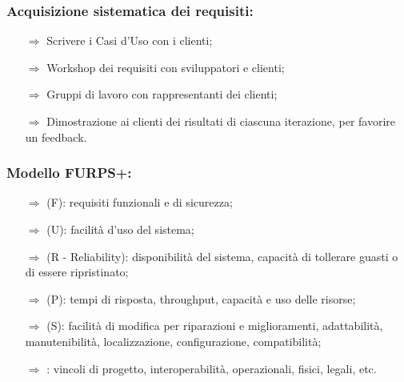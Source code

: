 
\subsubsection{Acquisizione sistematica dei requisiti:}

\begin{itemize}
    \item [$\Rightarrow$] Scrivere i Casi d'Uso con i clienti;
    \item [$\Rightarrow$] Workshop dei requisiti con sviluppatori e clienti;
    \item [$\Rightarrow$] Gruppi di lavoro con rappresentanti dei clienti;
    \item [$\Rightarrow$] Dimostrazione ai clienti dei risultati di ciascuna iterazione, per favorire un feedback.
\end{itemize}

\subsubsection{Modello FURPS+:}

\begin{itemize}
    \item [$\Rightarrow$]  (F): requisiti funzionali e di sicurezza;
    \item [$\Rightarrow$]  (U): facilità d'uso del sistema;
    \item [$\Rightarrow$]  (R - Reliability): disponibilità del sistema, capacità di tollerare guasti o di essere ripristinato;
    \item [$\Rightarrow$]  (P): tempi di risposta, throughput, capacità e uso delle risorse;
    \item [$\Rightarrow$]  (S): facilità di modifica per riparazioni e miglioramenti, adattabilità, manutenibilità, localizzazione, configurazione, compatibilità;
    \item [$\Rightarrow$] \fancyglitter{+}: vincoli di progetto, interoperabilità, operazionali, fisici, legali, etc.
\end{itemize}


